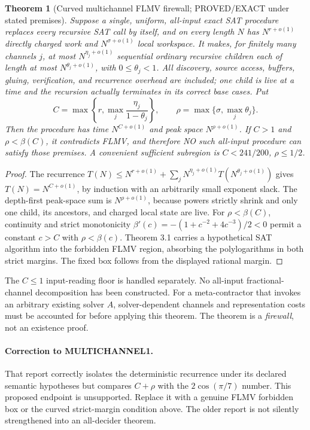 \documentclass[11pt]{article}
\newtheorem{theorem}{Theorem}
\begin{document}
\begin{theorem}[Curved multichannel FLMV firewall; PROVED/EXACT under stated premises]
Suppose a single, uniform, all-input exact SAT procedure replaces every recursive SAT call by itself, and on every length \(N\) has \(N^{r+o(1)}\) directly charged work and \(N^{\sigma+o(1)}\) local workspace. It makes, for finitely many channels \(j\), at most \(N^{\eta_j+o(1)}\) sequential ordinary recursive children each of length at most \(N^{\theta_j+o(1)}\), with \(0\leq \theta_j<1\). All discovery, source access, buffers, gluing, verification, and recurrence overhead are included; one child is live at a time and the recursion actually terminates in its correct base cases. Put
\[
 C=\max\left\{r,\max_j\frac{\eta_j}{1-\theta_j}\right\},\qquad
 \rho=\max\{\sigma,\max_j\theta_j\}.
\]
Then the procedure has time \(N^{C+o(1)}\) and peak space \(N^{\rho+o(1)}\). If \(C>1\) and \(\rho<\beta(C)\), it contradicts FLMV, and therefore NO such all-input procedure can satisfy those premises. A convenient sufficient subregion is \(C<241/200\), \(\rho\le 1/2\).
\end{theorem}
\begin{proof}
The recurrence \(T(N)\le N^{r+o(1)}+\sum_jN^{\eta_j+o(1)}T(N^{\theta_j+o(1)})\) gives \(T(N)=N^{C+o(1)}\), by induction with an arbitrarily small exponent slack. The depth-first peak-space sum is \(N^{\rho+o(1)}\), because powers strictly shrink and only one child, its ancestors, and charged local state are live. For \(\rho<\beta(C)\), continuity and strict monotonicity \(\beta'(c)=-(1+c^{-2}+4c^{-3})/2<0\) permit a constant \(c>C\) with \(\rho<\beta(c)\). Theorem 3.1 carries a hypothetical SAT algorithm into the forbidden FLMV region, absorbing the polylogarithms in both strict margins. The fixed box follows from the displayed rational margin.
\end{proof}
The \(C\le1\) input-reading floor is handled separately. No all-input fractional-channel decomposition has been constructed. For a meta-contractor that invokes an arbitrary existing solver \(A\), solver-dependent channels and representation costs must be accounted for before applying this theorem. The theorem is a \emph{firewall}, not an existence proof.

\paragraph{Correction to MULTICHANNEL1.}
That report correctly isolates the deterministic recurrence under its declared semantic hypotheses but compares \(C+\rho\) with the \(2\cos(\pi/7)\) number. This proposed endpoint is unsupported. Replace it with a genuine FLMV forbidden box or the curved strict-margin condition above. The older report is not silently strengthened into an all-decider theorem.
\end{document}

